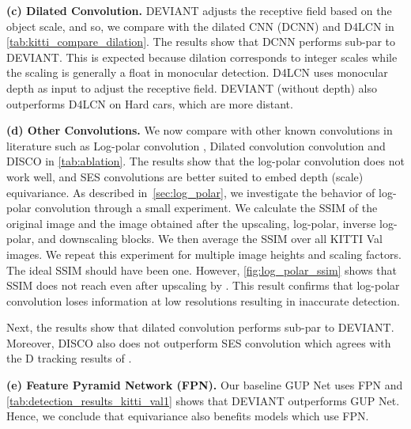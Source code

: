 \documentclass[runningheads]{llncs}
\newcommand{\twoD}{D}
\newcommand{\equivariance}{equivariance}
\newcommand{\ses}{SES}
\newcommand{\logPolar}{log-polar}
\newcommand{\LogPolar}{Log-polar}
\newcommand{\kitti}{KITTI}
\newcommand{\valOne}{Val}
\newcommand{\gupNet}{GUP Net}
\newcommand{\noIndentHeading}[1]{\noindent\textbf{#1}}
\newcommand{\methodName}{DEVIANT}
\begin{document}
\noIndentHeading{(c) Dilated Convolution.}
            \methodName{} adjusts the receptive field based on the object scale, and so, we compare with the dilated CNN (DCNN) \cite{yu2015multi} and D4LCN \cite{ding2020learning} in \cref{tab:kitti_compare_dilation}.
            The results show that DCNN performs sub-par to \methodName.
            This is expected because dilation corresponds to integer scales \cite{worrall2019deep} while the scaling is generally a float in monocular detection.
            D4LCN \cite{ding2020learning} uses monocular depth as input to adjust the receptive field. 
            \methodName{} (without depth) also outperforms D4LCN on Hard cars, which are more distant. 

\noIndentHeading{(d) Other Convolutions.}
            We now compare with other known convolutions in literature such as \LogPolar{} convolution \cite{zwicke1983new}, Dilated convolution \cite{yu2015multi} convolution and DISCO \cite{sosnovik2021disco} in \cref{tab:ablation}. 
            The results show that the \logPolar{} convolution does not work well, and \ses{} convolutions are better suited to embed depth (scale) equivariance.
            As described in~\cref{sec:log_polar}, we investigate the behavior of \logPolar{} convolution through a small experiment.
            We calculate the SSIM \cite{wang2004image} of the original image and the image obtained after the upscaling, \logPolar, inverse \logPolar, and downscaling blocks.
            We then average the SSIM over all \kitti{} \valOne{} images. 
            We repeat this experiment for multiple image heights and scaling factors.
            The ideal SSIM should have been one.
            However, \cref{fig:log_polar_ssim} 
            shows that SSIM does not reach  even after upscaling by . 
            This result confirms that \logPolar{} convolution loses information at low resolutions resulting in inaccurate detection.
            
            Next, the results show that dilated convolution \cite{yu2015multi} performs sub-par to \methodName. 
            Moreover, DISCO \cite{sosnovik2021disco} also does not outperform \ses{} convolution which agrees with the \twoD{} tracking results of \cite{sosnovik2021disco}.

\noIndentHeading{(e) Feature Pyramid Network (FPN).}
            Our baseline \gupNet{} \cite{lu2021geometry} uses FPN \cite{lin2017feature} and \cref{tab:detection_results_kitti_val1} shows that \methodName{} outperforms \gupNet. Hence, we conclude that \equivariance{} also benefits models which use FPN. 
\end{document}

